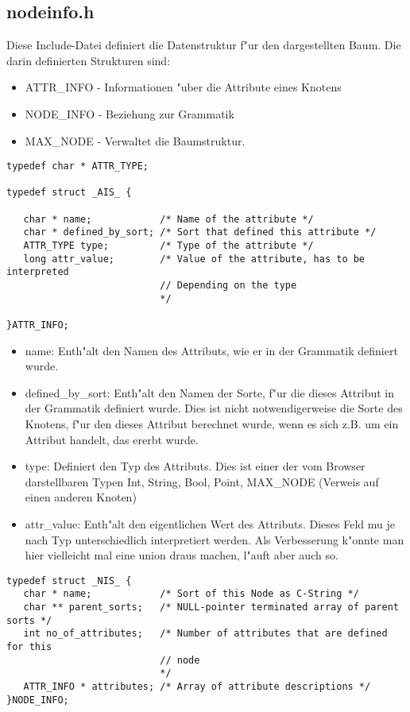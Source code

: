 \subsection{nodeinfo.h}
Diese Include-Datei definiert die Datenstruktur f"ur den dargestellten
Baum. Die darin definierten Strukturen sind:
\begin{itemize}
	\item ATTR\_INFO - Informationen "uber die Attribute eines Knotens
	\item NODE\_INFO - Beziehung zur Grammatik
	\item MAX\_NODE - Verwaltet die Baumstruktur.
\end{itemize}
\begin{verbatim}
typedef char * ATTR_TYPE;

typedef struct _AIS_ {

   char * name;            /* Name of the attribute */
   char * defined_by_sort; /* Sort that defined this attribute */
   ATTR_TYPE type;         /* Type of the attribute */
   long attr_value;        /* Value of the attribute, has to be interpreted 
                           // Depending on the type
                           */
   
}ATTR_INFO;

\end{verbatim}
\begin{itemize}
	\item name: Enth"alt den Namen des Attributs, wie er
	in der Grammatik definiert wurde.
	\item defined\_by\_sort: Enth"alt den Namen der Sorte, f"ur die 
	dieses Attribut in der Grammatik definiert wurde. Dies ist nicht
	notwendigerweise die Sorte des Knotens, f"ur den dieses Attribut
	berechnet wurde, wenn es sich z.B. um ein Attribut handelt, das
	ererbt wurde.
	\item type: Definiert den Typ des Attributs. Dies ist einer der
	vom Browser darstellbaren Typen Int, String, Bool, Point, MAX\_NODE
	(Verweis auf einen anderen Knoten)
	\item attr\_value: Enth"alt den eigentlichen Wert des Attributs.
	Dieses Feld mu\3 je nach Typ unterschiedlich interpretiert werden.
	Als Verbesserung k"onnte man hier vielleicht mal eine union
	draus machen, l"auft aber auch so.
\end{itemize}
\begin{verbatim}
typedef struct _NIS_ {
   char * name;            /* Sort of this Node as C-String */
   char ** parent_sorts;   /* NULL-pointer terminated array of parent sorts */
   int no_of_attributes;   /* Number of attributes that are defined for this 
                           // node
                           */
   ATTR_INFO * attributes; /* Array of attribute descriptions */
}NODE_INFO;

\end{verbatim}
